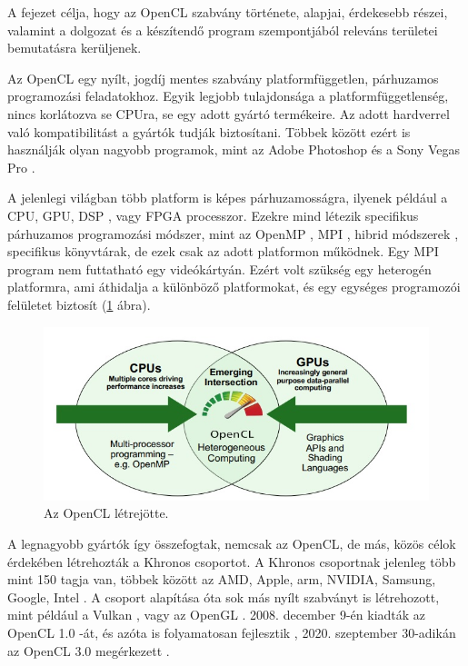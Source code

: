 
A fejezet célja, hogy az OpenCL szabvány története, alapjai, érdekesebb részei, valamint a dolgozat és a készítendő program szempontjából releváns területei bemutatásra kerüljenek.

Az OpenCL egy nyílt, jogdíj mentes szabvány platformfüggetlen, párhuzamos programozási feladatokhoz. Egyik legjobb tulajdonsága a platformfüggetlenség, nincs korlátozva se CPUra, se egy adott gyártó termékeire. Az adott hardverrel való kompatibilitást a gyártók tudják biztosítani. Többek között ezért is használják olyan nagyobb programok, mint az Adobe Photoshop \cite{adobe} és a Sony Vegas Pro \cite{vegas}.

A jelenlegi világban több platform is képes párhuzamosságra, ilyenek például a CPU, GPU, DSP \cite{dsp}, vagy FPGA \cite{fpga} processzor. Ezekre mind létezik specifikus párhuzamos programozási módszer, mint az OpenMP \cite{openmp}, MPI \cite{mpi}, hibrid módszerek \cite{hybrid}, specifikus könyvtárak, de ezek csak az adott platformon működnek. Egy MPI program nem futtatható egy videókártyán. Ezért volt szükség egy heterogén platformra, ami áthidalja a különböző platformokat, és egy egységes programozói felületet biztosít (\ref{fig:openCl} ábra).

\begin{figure}[h]
\centering
\includegraphics[scale=0.7]{images/opencl_origin.jpg}
\caption{Az OpenCL létrejötte. \cite{opencl_origin}}
\label{fig:openCl}
\end{figure}

A legnagyobb gyártók így összefogtak, nemcsak az OpenCL, de más, közös célok érdekében létrehozták a Khronos csoportot. A Khronos csoportnak jelenleg több mint 150 tagja van, többek között az AMD, Apple, arm, NVIDIA, Samsung, Google, Intel \cite{khronos_about} \cite{khronos_members}. A csoport alapítása óta sok más nyílt szabványt is létrehozott, mint például a Vulkan \cite{vulkan}, vagy az OpenGL \cite{opengl}. 2008. december 9-én kiadták az OpenCL 1.0 -át, és azóta is folyamatosan fejlesztik \cite{opencl1}, 2020. szeptember 30-adikán az OpenCL 3.0 megérkezett \cite{opencl}.

